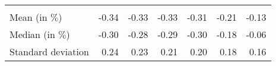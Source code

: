 \begin{tabular}{lllllll}
  \multicolumn{1}{r}{} &
  \multicolumn{1}{r}{} \\
\multicolumn{1}{l}{\hspace{1em}Mean (in $\%$)} &
  \multicolumn{1}{|r}{-0.34} &
  \multicolumn{1}{r}{-0.33} &
  \multicolumn{1}{r}{-0.33} &
  \multicolumn{1}{r}{-0.31} &
  \multicolumn{1}{r}{-0.21} &
  \multicolumn{1}{r}{-0.13} \\
\multicolumn{1}{l}{\hspace{1em}Median (in $\%$)} &
  \multicolumn{1}{|r}{-0.30} &
  \multicolumn{1}{r}{-0.28} &
  \multicolumn{1}{r}{-0.29} &
  \multicolumn{1}{r}{-0.30} &
  \multicolumn{1}{r}{-0.18} &
  \multicolumn{1}{r}{-0.06} \\
\multicolumn{1}{l}{\hspace{1em}Standard deviation} &
  \multicolumn{1}{|r}{0.24} &
  \multicolumn{1}{r}{0.23} &
  \multicolumn{1}{r}{0.21} &
  \multicolumn{1}{r}{0.20} &
  \multicolumn{1}{r}{0.18} &
  \multicolumn{1}{r}{0.16} \\
\cline{1-7}
\end{tabular}
